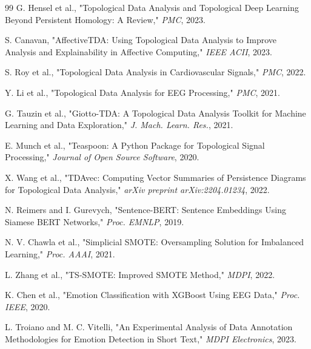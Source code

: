\begin{thebibliography}{99}
G. Hensel et al., "Topological Data Analysis and Topological Deep Learning Beyond Persistent Homology: A Review," \textit{PMC}, 2023.

S. Canavan, "AffectiveTDA: Using Topological Data Analysis to Improve Analysis and Explainability in Affective Computing," \textit{IEEE ACII}, 2023.

S. Roy et al., "Topological Data Analysis in Cardiovascular Signals," \textit{PMC}, 2022.

Y. Li et al., "Topological Data Analysis for EEG Processing," \textit{PMC}, 2021.

G. Tauzin et al., "Giotto-TDA: A Topological Data Analysis Toolkit for Machine Learning and Data Exploration," \textit{J. Mach. Learn. Res.}, 2021.

E. Munch et al., "Teaspoon: A Python Package for Topological Signal Processing," \textit{Journal of Open Source Software}, 2020.

X. Wang et al., "TDAvec: Computing Vector Summaries of Persistence Diagrams for Topological Data Analysis," \textit{arXiv preprint arXiv:2204.01234}, 2022.

N. Reimers and I. Gurevych, "Sentence-BERT: Sentence Embeddings Using Siamese BERT Networks," \textit{Proc. EMNLP}, 2019.

N. V. Chawla et al., "Simplicial SMOTE: Oversampling Solution for Imbalanced Learning," \textit{Proc. AAAI}, 2021.

L. Zhang et al., "TS-SMOTE: Improved SMOTE Method," \textit{MDPI}, 2022.

K. Chen et al., "Emotion Classification with XGBoost Using EEG Data," \textit{Proc. IEEE}, 2020.

L. Troiano and M. C. Vitelli, "An Experimental Analysis of Data Annotation Methodologies for Emotion Detection in Short Text," \textit{MDPI Electronics}, 2023.

\end{thebibliography}
